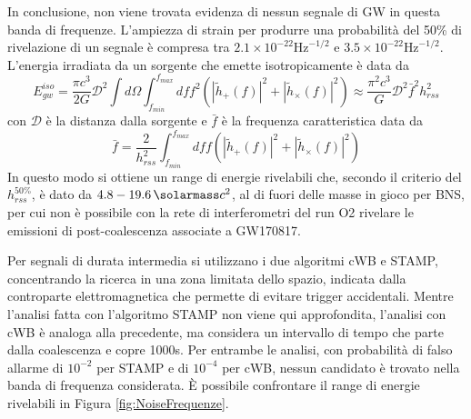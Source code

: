 In conclusione, non viene trovata evidenza di nessun segnale di GW in questa banda di frequenze.
L'ampiezza di strain per produrre una probabilità del 50\% di rivelazione di un segnale è compresa tra $2.1 \times 10^{-22} \text{Hz}^{-1/2}$ e $3.5 \times 10^{-22} \text{Hz}^{-1/2}$. L'energia irradiata da un sorgente che emette isotropicamente è data da 
\begin{equation}
E_{gw}^{iso} = \frac{\pi c^3}{2G}\mathcal{D}^2\int d\Omega \int_{f_{min}}^{f_{max}}dff^2(|\tilde{h}_+(f)|^2 + |\tilde{h}_\times(f)|^2 ) \approx \frac{\pi^2 c^3}{G}\mathcal{D}^2\bar{f}^2h_{rss}^2
\end{equation}
con $\mathcal{D}$ è la distanza dalla sorgente e $\bar{f}$ è la frequenza caratteristica data da 
\begin{equation}
\bar{f} = \frac{2}{h_{rss}^2}\int_{f_{min}}^{f_{max}}dff(|\tilde{h}_+(f)|^2 + |\tilde{h}_\times(f)|^2 )
\end{equation}
In questo modo si ottiene un range di energie rivelabili che, secondo il criterio del $h_{rss}^{50\%}$, è dato da $4.8-\SI{19.6}{\solarmass}c^2$, al di fuori delle masse in gioco per BNS, per cui non è possibile con la rete di interferometri del run O2 rivelare le emissioni di post-coalescenza associate a GW170817.

Per segnali di durata intermedia si utilizzano i due algoritmi cWB e STAMP, concentrando la ricerca in una zona limitata dello spazio, indicata dalla controparte elettromagnetica che permette di evitare trigger accidentali.
Mentre l'analisi fatta con l'algoritmo STAMP non viene qui approfondita, l'analisi con cWB è analoga alla precedente, ma considera un intervallo di tempo che parte dalla coalescenza e copre 1000s. Per entrambe le analisi, con probabilità di falso allarme di $10^{-2}$ per STAMP e di $10^{-4}$ per cWB, nessun candidato è trovato nella banda di frequenza considerata. È possibile confrontare il range di energie rivelabili in Figura \ref{fig:NoiseFrequenze}.

